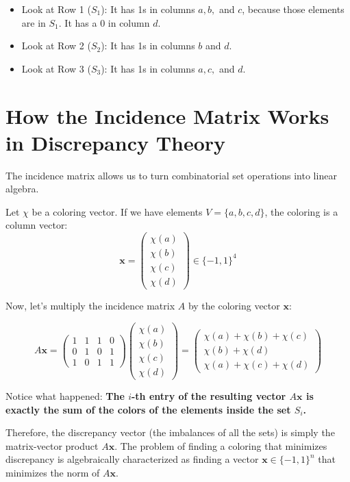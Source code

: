 \documentclass[11pt]{article}
\begin{document}
\begin{itemize}
    \item Look at Row 1 (\(S_1\)): It has 1s in columns \(a, b,\) and \(c\), because those elements are in \(S_1\). It has a 0 in column \(d\).
    \item Look at Row 2 (\(S_2\)): It has 1s in columns \(b\) and \(d\).
    \item Look at Row 3 (\(S_3\)): It has 1s in columns \(a, c,\) and \(d\).
\end{itemize}

\hrulefill

\section{How the Incidence Matrix Works in Discrepancy Theory}

The incidence matrix allows us to turn combinatorial set operations into linear algebra.

Let \(\chi\) be a coloring vector. If we have elements \(V = \{a, b, c, d\}\), the coloring is a column vector:
\[
 \mathbf{x} = \begin{pmatrix} \chi(a) \\ \chi(b) \\ \chi(c) \\ \chi(d) \end{pmatrix} \in \{-1, 1\}^4 
\]

Now, let's multiply the incidence matrix \(A\) by the coloring vector \(\mathbf{x}\):

\[
A\mathbf{x} = 
\begin{pmatrix}
1 & 1 & 1 & 0 \\
0 & 1 & 0 & 1 \\
1 & 0 & 1 & 1 
\end{pmatrix}
\begin{pmatrix} \chi(a) \\ \chi(b) \\ \chi(c) \\ \chi(d) \end{pmatrix}
= 
\begin{pmatrix}
\chi(a) + \chi(b) + \chi(c) \\
\chi(b) + \chi(d) \\
\chi(a) + \chi(c) + \chi(d)
\end{pmatrix}
\]

Notice what happened: \textbf{The \(i\)-th entry of the resulting vector \(A\mathbf{x}\) is exactly the sum of the colors of the elements inside the set \(S_i\).}

Therefore, the discrepancy vector (the imbalances of all the sets) is simply the matrix-vector product \(A\mathbf{x}\). The problem of finding a coloring that minimizes discrepancy is algebraically characterized as finding a vector \(\mathbf{x} \in \{-1, 1\}^n\) that minimizes the norm of \(A\mathbf{x}\).
\end{document}

